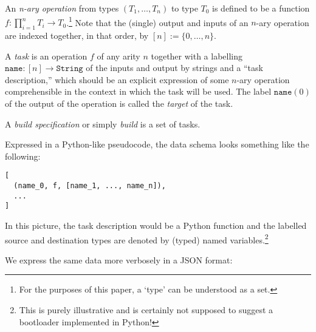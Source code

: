 \begin{definition}
  
  An \emph{n-ary operation} from types \((T_1,\ldots,T_n)\) to type \(T_0\) is defined to be a function \(f:\prod_{i=1}^n T_i \rightarrow T_0\).\footnote{For the purposes of this paper, a `type' can be understood as a set.}
  Note that the (single) output and inputs of an \(n\)-ary operation are indexed together, in that order, by \([n]:=\{0,\ldots,n\}\).

  A \emph{task} is an operation \(f\) of any arity \(n\) together with a labelling \(\mathtt{name}:[n]\rightarrow \mathtt{String}\) of the inputs and output by strings and a ``task description,'' which should be an explicit expression of some $n$-ary operation comprehensible in the context in which the task will be used.
  The label \(\mathtt{name}(0)\) of the output of the operation is called the \emph{target} of the task.

  A \emph{build specification} or simply \emph{build} is a set of tasks.

\end{definition}

Expressed in a Python-like pseudocode, the data schema looks something like the following:

\begin{lstlisting}
[
  (name_0, f, [name_1, ..., name_n]),
  ...
]
\end{lstlisting}

In this picture, the task description would be a Python function and the labelled source and destination types are denoted by (typed) named variables.\footnote{This is purely illustrative and is certainly not supposed to
suggest a bootloader implemented in Python!}

We express the same data more verbosely in a JSON format:

\begin{comment}
\begin{Shaded}
\begin{Highlighting}[]
\OtherTok{[}
    \FunctionTok{\{}
        \DataTypeTok{"target"}\FunctionTok{:} \FunctionTok{\{}\DataTypeTok{"label"}\FunctionTok{:} \StringTok{"name\_0"}\FunctionTok{,} \DataTypeTok{"type"}\FunctionTok{:} \StringTok{"T\_0"}\FunctionTok{\},}
        \DataTypeTok{"inputs"}\FunctionTok{:} \OtherTok{[}
            \FunctionTok{\{}\DataTypeTok{"label"}\FunctionTok{:} \StringTok{"name\_1"}\FunctionTok{,} \DataTypeTok{"type"}\FunctionTok{:} \StringTok{"T\_1"}\FunctionTok{\}}\OtherTok{,}
            \ErrorTok{...}\OtherTok{,}
            \FunctionTok{\{}\DataTypeTok{"label"}\FunctionTok{:} \StringTok{"name\_n"}\FunctionTok{,} \DataTypeTok{"type"}\FunctionTok{:} \StringTok{"T\_n"}\FunctionTok{\}}\OtherTok{,}
        \OtherTok{]}\FunctionTok{,}
        \DataTypeTok{"task"}\FunctionTok{:} \ErrorTok{@td}
    \FunctionTok{\}}\OtherTok{,}
    \ErrorTok{...}
\OtherTok{]}
\end{Highlighting}
\end{Shaded}
\end{comment}

